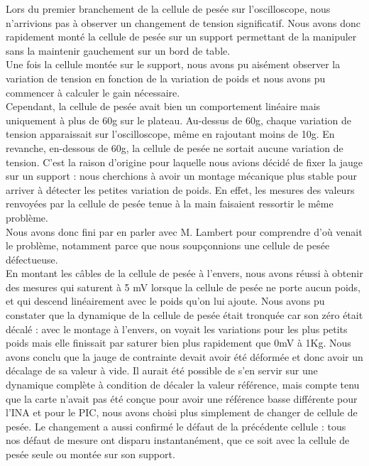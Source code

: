 \documentclass[a4paper,11pt,titlepage]{article}
\begin{document}
Lors du premier branchement de la cellule de pesée sur l'oscilloscope, nous n'arrivions pas à observer un changement de tension significatif. Nous avons donc rapidement monté la cellule de pesée sur un support permettant de la manipuler sans la maintenir gauchement sur un bord de table.\\

Une fois la cellule montée sur le support, nous avons pu aisément observer la variation de tension en fonction de la variation de poids et nous avons pu commencer à calculer le gain nécessaire.\\

Cependant, la cellule de pesée avait bien un comportement linéaire mais uniquement à plus de 60g sur le plateau. Au-dessus de 60g, chaque variation de tension apparaissait sur l'oscilloscope, même en rajoutant moins de 10g. En revanche, en-dessous de 60g, la cellule de pesée ne sortait aucune variation de tension. C'est la raison d'origine pour laquelle nous avions décidé de fixer la jauge sur un support : nous cherchions à avoir un montage mécanique plus stable pour arriver à détecter les petites variation de poids. En effet, les mesures des valeurs renvoyées par la cellule de pesée tenue à la main faisaient ressortir le même problème.\\

Nous avons donc fini par en parler avec M. Lambert pour comprendre d'où venait le problème, notamment parce que nous soupçonnions une cellule de pesée défectueuse.\\

En montant les câbles de la cellule de pesée à l'envers, nous avons réussi à obtenir des mesures qui saturent à 5 mV lorsque la cellule de pesée ne porte aucun poids, et qui descend linéairement avec le poids qu'on lui ajoute. Nous avons pu constater que la dynamique de la cellule de pesée était tronquée car son zéro était décalé : avec le montage à l'envers, on voyait les variations pour les plus petits poids mais elle finissait par saturer bien plus rapidement que 0mV à 1Kg. Nous avons conclu que la jauge de contrainte devait avoir été déformée et donc avoir un décalage de sa valeur à vide. Il aurait été possible de s'en servir sur une dynamique complète à condition de décaler la valeur référence, mais compte tenu que la carte n'avait pas été conçue pour avoir une référence basse différente pour l'INA et pour le PIC, nous avons choisi plus simplement de changer de cellule de pesée.
Le changement a aussi confirmé le défaut de la précédente cellule : tous nos défaut de mesure ont disparu instantanément, que ce soit avec la cellule de pesée seule ou montée sur son support.
\end{document}
